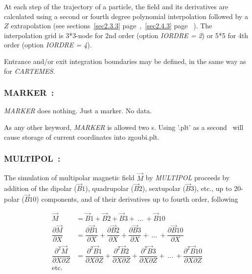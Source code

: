 {\medskip

\noindent At each step of the trajectory of a particle, the field and its 
derivatives are calculated using a second or fourth degree polynomial interpolation followed 
by a $ Z $ extrapolation (see sections~\ref{sec2.3.3} page~\pageref{sec2.3.3},~\ref{sec2.4.3} page ~\pageref{sec2.4.3}). 
 The interpolation grid is 3*3-node for 2nd order (option \textsl{IORDRE = 2}) or 5*5 
for 4th order (option \textsl{IORDRE = 4}). 

\medskip

\noindent Entrance and/or 
exit integration boundaries may be defined, in the same way as for \textsl{CARTEMES}.




\newpage

\subsubsection*{MARKER~: \MARKERTitl} \label{MARKER} 
\medskip

\textsl{MARKER} does nothing. Just a marker. No data. 

\bigskip

As any other keyword, \textsl{MARKER} is allowed two \LABEL s. Using 
 '.plt' as a second \LABEL\ will cause storage of current coordinates into 
zgoubi.plt. 





\newpage

\subsubsection*{MULTIPOL~:  \MULTIPOLTitl} \label{MULTIPOL}
\medskip 

The simulation of  multipolar magnetic field $ \vec  M $ by \textsl{MULTIPOL}  proceeds 
by addition of the dipolar  ($\vec  B1$),  quadrupolar ($ \vec  B2 $), sextupolar 
($ \vec  B3 $), etc., up to 20-polar  ($\vec  B10$) 
components, and of their derivatives up to fourth order, following

\begin{align*}
	\vec  M &   =   \vec B1+\vec  B2+\vec  B3+ \ ...\ +\vec  B10  \\ 
	\dfrac{ \partial\vec M }{ \partial X} 
	        &   = \dfrac{ \partial\vec  B1}{ \partial X} + 
	        \dfrac{\partial\vec  B2 }{ \partial X} + 
	        \dfrac{\partial\vec  B3}{ \partial X} + 
                            \ ...\ +
	        \dfrac{\partial\vec  B10 }{ \partial X} \\
	\dfrac{ \partial^ 2\vec  M }{ \partial X\partial Z} 
	       & = \dfrac{ \partial^ 2\vec  B1 }{ \partial X\partial Z} + 
	       \dfrac{\partial^ 2\vec  B2 }{ \partial X\partial Z} + 
	       \dfrac{\partial^ 2\vec  B3}{ \partial X\partial Z} + 
                            \ ...\ +
 	       \dfrac{\partial^ 2\vec  B10}{ \partial X\partial Z} \\
	\text{etc. } &
\end{align*}


}
